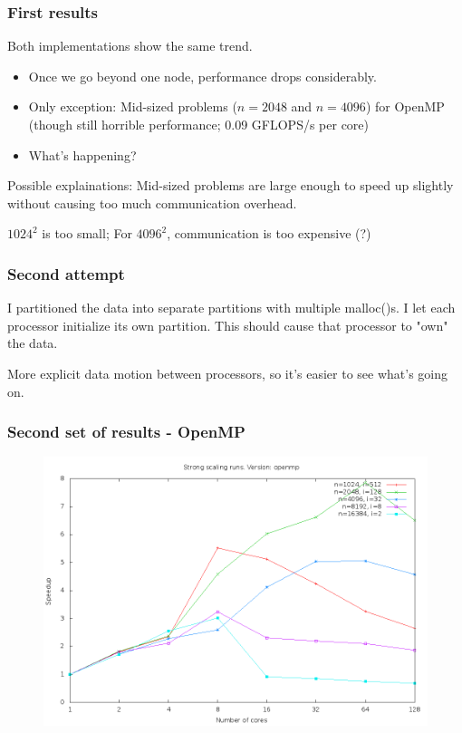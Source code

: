 \documentclass{beamer}
\begin{document}
\begin{frame}
\frametitle{First results}
Both implementations show the same trend.
\pause
\begin{itemize}
\item Once we go beyond one node, performance drops considerably.
\pause
\item Only exception: Mid-sized problems ($n=2048$ and $n=4096$) for OpenMP (though still horrible performance; 0.09 GFLOPS/s per core)
\item What's happening?
\end{itemize}

\pause
Possible explainations: Mid-sized problems are large enough to speed up slightly without causing too much communication overhead.
\pause

$1024^2$ is too small; For $4096^2$, communication is too expensive (?)
\end{frame}

\begin{frame}
\frametitle{Second attempt}
I partitioned the data into separate partitions with multiple malloc()s.
\pause
I let each processor initialize its own partition. This should cause that processor to "own" the data.
\pause

More explicit data motion between processors, so it's easier to see what's going on.
\end{frame}

\begin{frame}
\frametitle{Second set of results - OpenMP}
\begin{figure}
\includegraphics[width=\textwidth]{gfx/partitions_strong_scaling_openmp_speedup}
\end{figure}
\end{frame}
\end{document}
